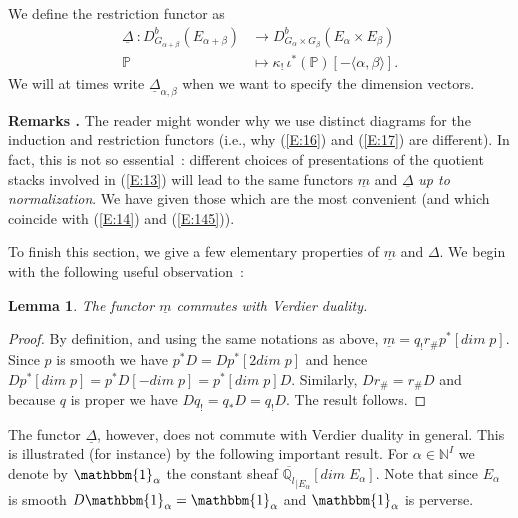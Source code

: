 \documentclass[a4paper,10pt]{amsart}
\def\N{\mathbb{N}}
\def\a{\alpha}
\def\qlb{\overline{\mathbb{Q}_l}}
\newtheorem{lem}[theo]{Lemma}
\numberwithin{equation}{section}
\begin{document}
\vspace{.1in}

We define the restriction functor as 
\begin{equation} \label{E:18}
\begin{split}
\underline{\Delta}~: D^b_{G_{\a+\beta}}(E_{\alpha+\beta}) &\to D^b_{G_{\a} \times G_{\beta}}(E_{\alpha} \times E_{\beta})\\
\mathbb{P} &\mapsto \kappa_{!}\,\iota^* (\mathbb{P})[-\langle \alpha,\beta\rangle].
\end{split}
\end{equation}
We will at times write $\underline{\Delta}_{\alpha,\beta}$ when we want to specify the dimension vectors.

\vspace{.2in}

\addtocounter{theo}{1}
\noindent \textbf{Remarks \thetheo .} The reader might wonder why we use distinct diagrams for the induction and restriction functors (i.e., why (\ref{E:16}) and (\ref{E:17}) are different). In fact, this is not so essential~: different choices of presentations of the quotient stacks involved in (\ref{E:13}) will lead to the same functors $\underline{m}$ and $\underline{\Delta}$ \textit{up to normalization}. We have given those which are the most convenient (and which coincide with (\ref{E:14}) and (\ref{E:145})).

\vspace{.15in}

To finish this section, we give a few elementary properties of $\underline{m}$ and $\Delta$. We begin with the following useful observation~:

\vspace{.1in}

\begin{lem}\label{L:Verdierind} The functor $\underline{m}$ commutes with Verdier duality.\end{lem}
\begin{proof} By definition, and using the same notations as above, $\underline{m}=q_!r_{\#}p^*[dim\;p]$. Since $p$ is smooth we have $p^*D=D p^*[2dim\;p]$ and hence $D p^*[dim\;p]=p^*D[-dim\;p]=p^*[dim\;p]D$. Similarly, $D r_{\#}=r_{\#}D$ and because $q$ is proper we have $Dq_!=q_*D=q_!D$. The result follows.
\end{proof}

\vspace{.1in}

The functor $\underline{\Delta}$, however, does not commute with Verdier duality in general. This is illustrated (for instance) by the following important result. For $\alpha \in \N^I$ we denote by $\mathbbm{1}_{\alpha}$ the constant sheaf $\qlb_{|E_{\alpha}}[dim\;E_{\alpha}]$. Note that since $E_{\alpha}$ is smooth $D \mathbbm{1}_{\alpha}=\mathbbm{1}_{\alpha}$ and $\mathbbm{1}_{\alpha}$ is perverse.
\end{document}

